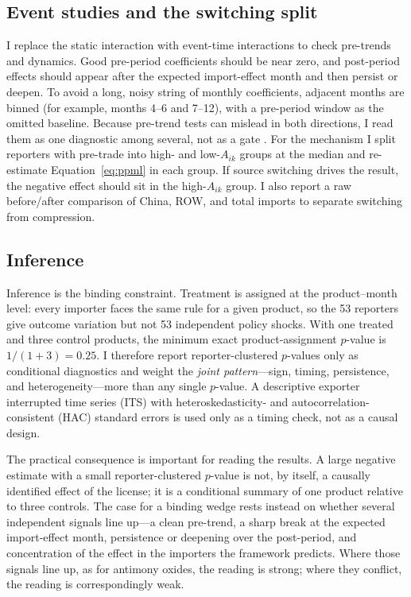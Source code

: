 \documentclass[12pt,a4paper]{article}
\begin{document}
\subsection{Event studies and the switching split}\label{sec:eventstudies}

I replace the static interaction with event-time interactions to check pre-trends
and dynamics. Good pre-period coefficients should be near zero, and post-period
effects should appear after the expected import-effect month and then persist or
deepen. To avoid a long, noisy string of monthly coefficients, adjacent months
are binned (for example, months 4--6 and 7--12), with a pre-period window as the
omitted baseline. Because pre-trend tests can mislead in both directions, I read
them as one diagnostic among several, not as a gate \citep{roth2022pretest}. For
the mechanism I split reporters with pre-trade into high- and low-$A_{ik}$
groups at the median and re-estimate Equation~\eqref{eq:ppml} in each group. If
source switching drives the result, the negative effect should sit in the
high-$A_{ik}$ group. I also report a raw before/after comparison of China, ROW,
and total imports to separate switching from compression.

\subsection{Inference}\label{sec:inference}

Inference is the binding constraint. Treatment is assigned at the
product--month level: every importer faces the same rule for a given product, so
the 53 reporters give outcome variation but not 53 independent policy shocks.
With one treated and three control products, the minimum exact
product-assignment $p$-value is $1/(1+3)=0.25$. I therefore report
reporter-clustered $p$-values only as conditional diagnostics and weight the
\emph{joint pattern}---sign, timing, persistence, and heterogeneity---more than
any single $p$-value. A descriptive exporter interrupted time series (ITS) with
heteroskedasticity- and autocorrelation-consistent (HAC) standard errors is used
only as a timing check, not as a causal design.

The practical consequence is important for reading the results. A large negative
estimate with a small reporter-clustered $p$-value is not, by itself, a
causally identified effect of the license; it is a conditional summary of one
product relative to three controls. The case for a binding wedge rests instead
on whether several independent signals line up---a clean pre-trend, a sharp
break at the expected import-effect month, persistence or deepening over the
post-period, and concentration of the effect in the importers the framework
predicts. Where those signals line up, as for antimony oxides, the reading is
strong; where they conflict, the reading is correspondingly weak.
\end{document}
